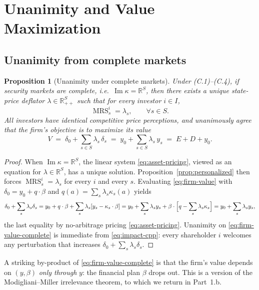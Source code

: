 \documentclass[11pt,a4paper]{article}
\def\R{\mathbb{R}}
\DeclareMathOperator{\MRS}{MRS}
\DeclareMathOperator{\Range}{Im}
\theoremstyle{plain}
\newtheorem{proposition}[theorem]{Proposition}
\theoremstyle{definition}
\theoremstyle{remark}
\begin{document}
\section{Unanimity and Value Maximization}

\subsection{Unanimity from complete markets}

\begin{proposition}[Unanimity under complete markets]\label{prop:unanimity-complete}
Under \textup{(C.1)--(C.4)}, if security markets are complete, i.e.\ $\Range\kappa = \R^S$, then there exists a unique state-price deflator $\lambda\in\R^S_{++}$ such that for every investor $i\in I$,
\[
  \MRS^i_s = \lambda_s,\qquad \forall s\in S.
\]
All investors have identical competitive price perceptions, and unanimously agree that the firm's objective is to maximize its value
\begin{equation}\label{eq:firm-value-complete}
  V \;=\; \delta_0 + \sum_{s\in S}\lambda_s\,\delta_s
  \;=\; y_0 + \sum_{s\in S}\lambda_s\,y_s
  \;=\; E + D + y_0.
\end{equation}
\end{proposition}

\begin{proof}
When $\Range\kappa = \R^S$, the linear system \eqref{eq:asset-pricing}, viewed as an equation for $\lambda\in\R^S$, has a unique solution. Proposition~\ref{prop:personalized} then forces $\MRS^i_s = \lambda_s$ for every $i$ and every $s$. Evaluating \eqref{eq:firm-value} with $\delta_0 = y_0+q\cdot\beta$ and $q(a)=\sum_s\lambda_s\kappa_s(a)$ yields
\[
  \delta_0 + \sum_s \lambda_s\delta_s
  = y_0 + q\cdot\beta + \sum_s\lambda_s[y_s-\kappa_s\cdot\beta]
  = y_0 + \sum_s\lambda_s y_s + \beta\cdot\Bigl[q - \sum_s\lambda_s\kappa_s\Bigr]
  = y_0 + \sum_s\lambda_s y_s,
\]
the last equality by no-arbitrage pricing \eqref{eq:asset-pricing}. Unanimity on \eqref{eq:firm-value-complete} is immediate from \eqref{eq:impact-cpp}: every shareholder $i$ welcomes any perturbation that increases $\delta_0+\sum_s\lambda_s\delta_s$.
\end{proof}

A striking by-product of \eqref{eq:firm-value-complete} is that the firm's value depends on $(y,\beta)$ \emph{only through} $y$: the financial plan $\beta$ drops out. This is a version of the Modigliani--Miller irrelevance theorem, to which we return in Part~1.b.
\end{document}

